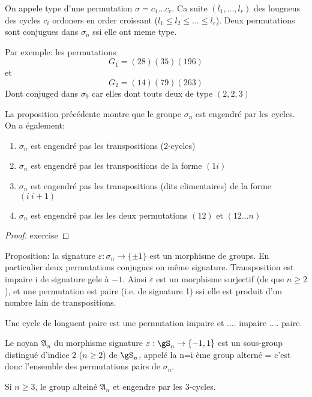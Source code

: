 \begin{proposition}
	On appele type d'une permutation $\sigma=c_1... c_r$. Ca suite $(l_1,...,l_r)$ des lougneus des cycles $c_i$ ordoners en order croissant ($l_1\leq l_2\leq ... \leq l_r$).
	Deux permutations sont conjugues dans $\sigma_n$ ssi elle ont meme type.
\end{proposition}

Par exemple: les permutations
$$G_1=(28)(35)(196)$$
et
$$G_2=(14)(79)(263)$$
Dont conjuged dans $\sigma_9$ car elles dont touts deux de type $(2,2,3)$


La proposition précédente montre que le groupe $\sigma_n$ est engendré par les cycles. On a également:

\begin{theorem}
	\begin{enumerate}
		\item $\sigma_n$ est engendré pas les transpositions (2-cycles)
		\item $\sigma_n$ est engendré pas les transpositions de la forme $(1 i)$
		\item $\sigma_n$ est engendré pas les transpositions (dits elimentaires) de la forme $(i\ i+1)$
		\item $\sigma_n$ est engendré pas les les deux permutations $(12)$ et $(12...n)$
	\end{enumerate}
	
\end{theorem}
\begin{proof}
	exercise
\end{proof}

Proposition: la signature $\varepsilon : \sigma_n\rightarrow\{\pm 1\}$ est un morphisme de groups. En particulier deux permutations conjugues on même signature.
Transposition est impaire i de signature gele à $-1$.
Ainsi $\varepsilon$ est un morphisme surjectif (de que $n\geq 2$), et une permutation est paire (i.e. de signature 1) ssi elle est produit d'un nombre lain de transpositions.

Une cycle de longuent paire est une permutation impaire et .... impaire .... paire.

Le noyan $\mathfrak{A}_n$ du morphisme signature $\varepsilon:\gS_n\rightarrow\{-1, 1\}$ est un sous-group distingué d'indice 2 ($n\geq2$) de $\gS_n$, appelé la n=i ème group alterné = c'est donc l'ensemble des permutations pairs de $\sigma_n$.

\begin{proposition}
	Si $n\geq 3$, le group alteiné $\mathfrak{A}_n$ et engendre par les 3-cycles.
\end{proposition}

